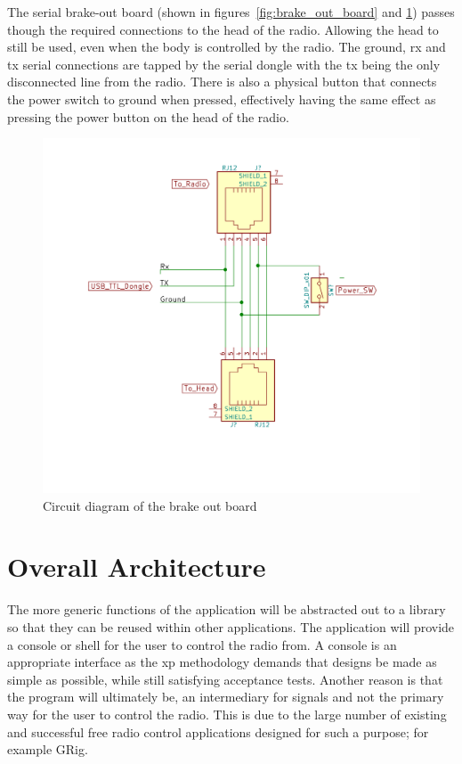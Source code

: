 The serial brake-out board (shown in figures~\ref{fig:brake_out_board} and \ref{fig:circuit_diagram}) passes though the required connections to the head of the radio. Allowing the head to still be used, even when the body is controlled by the radio. The ground, \gls{rx} and \gls{tx} serial connections are tapped by the serial dongle with the \gls{tx} being the only disconnected line from the radio. There is also a physical button that connects the power switch to ground when pressed, effectively having the same effect as pressing the power button on the head of the radio.

\begin{figure}
    \centering
    \includegraphics[width=\textwidth]{img/circit.png}
    \caption[Circuit diagram]{Circuit diagram of the brake out board}
    \label{fig:circuit_diagram}
\end{figure}

\section{Overall Architecture}
The more generic functions of the application will be abstracted out to a library so that they can be reused within other applications. The application will provide a console or shell for the user to control the radio from. A console is an appropriate interface as the \gls{xp} methodology demands that designs be made as simple as possible, while still satisfying acceptance tests. Another reason is that the program will ultimately be, an intermediary for signals and not the primary way for the user to control the radio. This is due to the large number of existing and successful free radio control applications designed for such a purpose; for example GRig\cite{grig}. 

